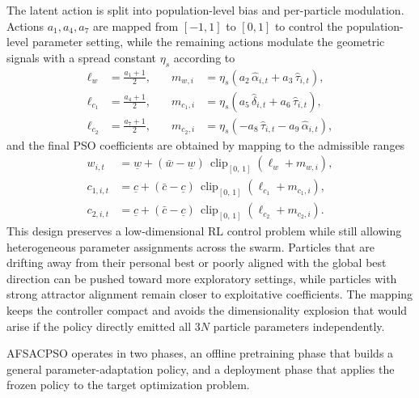 \documentclass[final,5p,times]{elsarticle}
\newcommand{\symPopsize}{N}
\newcommand{\symWclipMin}{\underline{w}}
\newcommand{\symWclipMax}{\bar{w}}
\newcommand{\symCclipMin}{\underline{c}}
\newcommand{\symCclipMax}{\bar{c}}
\newcommand{\symSpread}{\eta_s}
\begin{document}
The latent action is split into population-level bias and per-particle modulation.
Actions $a_1, a_4, a_7$ are mapped from $[-1,1]$ to $[0,1]$ to control the population-level parameter setting, while the remaining actions modulate the geometric signals with a spread constant $\symSpread$ according to
\begin{equation}
\begin{aligned}
\ell_{w} &= \tfrac{a_1 + 1}{2}, &\quad
m_{w,i} &= \symSpread\!\left(a_2\,\hat{\alpha}_{i,t} + a_3\,\hat{\tau}_{i,t}\right), \\
\ell_{c_1} &= \tfrac{a_4 + 1}{2}, &\quad
m_{c_1,i} &= \symSpread\!\left(a_5\,\hat{\delta}_{i,t} + a_6\,\hat{\tau}_{i,t}\right), \\
\ell_{c_2} &= \tfrac{a_7 + 1}{2}, &\quad
m_{c_2,i} &= \symSpread\!\left({-a_8}\,\hat{\tau}_{i,t} - a_9\,\hat{\alpha}_{i,t}\right),
\end{aligned}
\label{eq:rank_residual_delta}
\end{equation}
and the final PSO coefficients are obtained by mapping to the admissible ranges
\begin{equation}
\begin{aligned}
w_{i,t} &= \symWclipMin + (\symWclipMax - \symWclipMin)\,\operatorname{clip}_{[0,\,1]}\!\left(\ell_{w} + m_{w,i}\right), \\
c_{1,i,t} &= \symCclipMin + (\symCclipMax - \symCclipMin)\,\operatorname{clip}_{[0,\,1]}\!\left(\ell_{c_1} + m_{c_1,i}\right), \\
c_{2,i,t} &= \symCclipMin + (\symCclipMax - \symCclipMin)\,\operatorname{clip}_{[0,\,1]}\!\left(\ell_{c_2} + m_{c_2,i}\right).
\end{aligned}
\label{eq:rank_residual_final}
\end{equation}
This design preserves a low-dimensional RL control problem while still allowing heterogeneous parameter assignments across the swarm.
Particles that are drifting away from their personal best or poorly aligned with the global best direction can be pushed toward more exploratory settings, while particles with strong attractor alignment remain closer to exploitative coefficients.
The mapping keeps the controller compact and avoids the dimensionality explosion that would arise if the policy directly emitted all $3\symPopsize$ particle parameters independently.

AFSACPSO operates in two phases, an offline pretraining phase that builds a general parameter-adaptation policy, and a deployment phase that applies the frozen policy to the target optimization problem.
\end{document}
